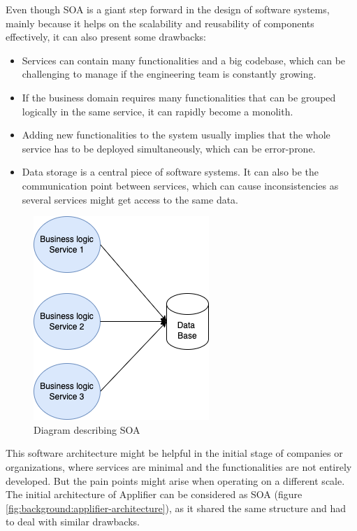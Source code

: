 \documentclass[english, 12pt, a4paper, sci, utf8, a-1b, online]{aaltothesis}
\begin{document}
Even though SOA is a giant step forward in the design of software systems, mainly because it helps on the scalability and reusability of components effectively, it can also present some drawbacks:

\begin{itemize}
    \item Services can contain many functionalities and a big codebase, which can be challenging to manage if the engineering team is constantly growing.
    \item If the business domain requires many functionalities that can be grouped logically in the same service, it can rapidly become a monolith. 
    \item Adding new functionalities to the system usually implies that the whole service has to be deployed simultaneously, which can be error-prone.
    \item Data storage is a central piece of software systems. It can also be the communication point between services, which can cause inconsistencies as several services might get access to the same data.
\end{itemize}

\begin{figure}[h]
    \centering
    \includegraphics[scale=0.4]{src/thesis/img/literature-review/SOA.png}
    \caption{Diagram describing SOA}
    \label{fig:soa-architecture}
\end{figure}

This software architecture might be helpful in the initial stage of companies or organizations, where services are minimal and the functionalities are not entirely developed. But the pain points might arise when operating on a different scale. The initial architecture of Applifier can be considered as SOA (figure \ref{fig:background:applifier-architecture}), as it shared the same structure and had to deal with similar drawbacks.
\end{document}
